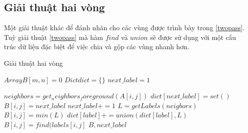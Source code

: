 \subsection{Giải thuật hai vòng}
Một giải thuật khác để đánh nhãn cho các vùng được trình bày trong \ref{twopass}. Tuỳ giải thuật \ref{twopass} mà hàm $find$ và $union$ sẽ được sử dụng với một cấu trúc dữ liệu đặc biệt để việc chia và gộp các vùng nhanh hơn.
\begin{algorithm}
  \caption{Giải thuật hai vòng}\label{twopass}
  \begin{algorithmic}[1]
    \State $Array B[m, n] = 0$ 
    \State $Dict dict = \{\}$
    \State $next\_label = 1$
    
                \State $neighbors = get_neighbors_foreground(A[i,j])$
                    \State $dict[next\_label] = set()$
                    \State $B[i,j] = next\_label$
                    \State $next\_label += 1$
                \Else
                    \State $L = getLabels(neigbors)$
                    \State $B[i,j] = min(L)$
                        \State $dict[label] += union(dict[label], L)$
                    \EndFor
                \EndIf
            \EndIf
        \EndFor   
    \EndFor
                \State $B[i,j] = find(labels[i,j]$
            \EndIf
        \EndFor   
    \EndFor
    \Return $B, next\_label$
    \EndProcedure
  \end{algorithmic}
\end{algorithm}
